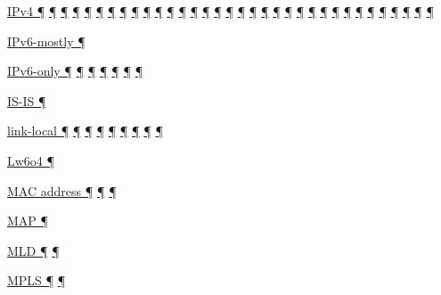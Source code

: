 \documentclass[
]{article}
\begin{document}
\hyperref[how-a-network-operations-center-sees-ipv6]{IPv4 ¶}
\hyperref[how-an-application-programmer-sees-ipv6]{¶}
\hyperref[why-version-6]{¶} \hyperref[address-resolution]{¶}
\hyperref[addresses]{¶} \hyperref[dns]{¶}
\hyperref[extension-headers-and-options]{¶}
\hyperref[layer-2-functions]{¶} \hyperref[managed-configuration]{¶}
\hyperref[routing]{¶}
\hyperref[source-and-destination-address-selection]{¶}
\hyperref[traffic-class-and-flow-label]{¶}
\hyperref[transport-protocols]{¶} \hyperref[further-reading]{¶}
\hyperref[coexistence-with-legacy-ipv4]{¶}
\hyperref[dual-stack-scenarios]{¶}
\hyperref[ipv6-primary-differences-from-ipv4]{¶}
\hyperref[obsolete-techniques]{¶}
\hyperref[translation-and-ipv4-as-a-service]{¶} \hyperref[tunnels]{¶}
\hyperref[security]{¶} \hyperref[filtering]{¶}
\hyperref[layer-2-considerations]{¶} \hyperref[topology-obfuscation]{¶}
\hyperref[network-design]{¶} \hyperref[address-planning]{¶}
\hyperref[address-and-prefix-management]{¶}
\hyperref[benchmarking-and-monitoring]{¶}
\hyperref[energy-consumption]{¶} \hyperref[multi-prefix-operation]{¶}
\hyperref[multihoming]{¶} \hyperref[cern-and-the-lhc]{¶}
\hyperref[deployment-by-carriers]{¶}
\hyperref[deployment-in-the-home]{¶}

\hyperref[dual-stack-scenarios]{IPv6-mostly ¶}

\hyperref[routing]{IPv6-only ¶}
\hyperref[source-and-destination-address-selection]{¶}
\hyperref[coexistence-with-legacy-ipv4]{¶}
\hyperref[dual-stack-scenarios]{¶}
\hyperref[translation-and-ipv4-as-a-service]{¶} \hyperref[tunnels]{¶}
\hyperref[deployment-by-carriers]{¶}

\hyperref[routing]{IS-IS ¶}

\hyperref[address-resolution]{link-local ¶} \hyperref[addresses]{¶}
\hyperref[auto-configuration]{¶} \hyperref[dns]{¶}
\hyperref[source-and-destination-address-selection]{¶}
\hyperref[filtering]{¶} \hyperref[energy-consumption]{¶}
\hyperref[multi-prefix-operation]{¶}
\hyperref[deployment-in-the-home]{¶}

\hyperref[translation-and-ipv4-as-a-service]{Lw6o4 ¶}

\hyperref[address-resolution]{MAC address ¶} \hyperref[addresses]{¶}
\hyperref[address-and-prefix-management]{¶}

\hyperref[translation-and-ipv4-as-a-service]{MAP ¶}

\hyperref[address-resolution]{MLD ¶}
\hyperref[layer-2-considerations]{¶}

\hyperref[layer-2-functions]{MPLS ¶} \hyperref[tunnels]{¶}
\end{document}
